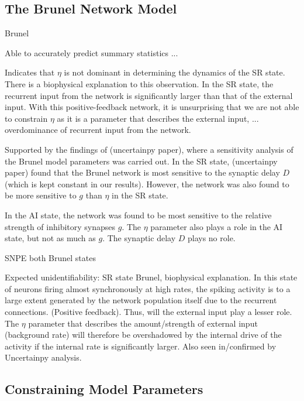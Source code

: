 \subsection{The Brunel Network Model}

Brunel 

Able to accurately predict summary statistics ...


Indicates that $\eta$ is not dominant in determining the dynamics of the SR state. There is a biophysical explanation to this observation. In the SR state, the recurrent input from the network is significantly larger than that of the external input. With this positive-feedback network, it is unsurprising that we are not able to constrain $\eta$ as it is a parameter that describes the external input, ... overdominance of recurrent input from the network. 

Supported by the findings of (uncertainpy paper), where a sensitivity analysis of the Brunel model parameters was carried out. In the SR state, (uncertainpy paper) found that the Brunel network is most sensitive to the synaptic delay $D$ (which is kept constant in our results). However, the network was also found to be more sensitive to $g$ than $\eta$ in the SR state. 

In the AI state, the network was found to be most sensitive to the relative strength of inhibitory synapses $g$. The $\eta$ parameter also plays a role in the AI state, but not as much as $g$. The synaptic delay $D$ plays no role. 

SNPE both Brunel states

Expected unidentifiability: SR state Brunel, biophysical explanation. In this state of neurons firing almost synchronously at high rates, the spiking activity is to a large extent generated by the network population itself due to the recurrent connections. (Positive feedback). Thus, will the external input play a lesser role. The $\eta$ parameter that describes the amount/strength of external input (background rate) will therefore be overshadowed by the internal drive of the activity if the internal rate is significantly larger. Also seen in/confirmed by Uncertainpy analysis.

\subsection{Constraining Model Parameters}


